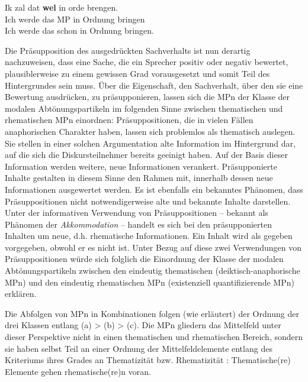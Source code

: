 \begin{exe}
	\ex\label{175} 
	\gll Ik zal dat \textbf{wel} in orde brengen.\\
	 Ich werde das MP in Ordnung bringen \\
	 \glt Ich werde das schon in Ordnung bringen. 
	 \newline
	 \hbox{}\hfill\hbox{\citet[55]{Vriendt1991}}
\end{exe}
Die Präsupposition  des ausgedrückten Sachverhalts ist nun derartig nachzuwei\-sen, dass eine Sache, die ein Sprecher positiv oder negativ bewertet, plausiblerweise zu einem gewissen Grad vorausgesetzt und somit Teil des Hintergrundes sein muss. Über die Eigenschaft, den Sachverhalt, über den sie eine Bewertung ausdrücken, zu präsupponieren, lassen sich die MPn der Klasse der modalen Abtönungspartikeln  im folgenden Sinne zwischen thematischen und rhematischen MPn einordnen: Präsuppositionen, die in vielen Fällen anaphorischen Charakter haben, lassen sich problemlos als thematisch auslegen. Sie stellen in einer solchen Argumentation alte Information im Hintergrund  dar, auf die sich die Diskursteilnehmer bereits geeinigt haben. Auf der Basis dieser Information werden weitere, neue Informationen verankert. Präsupponierte Inhalte gestalten in diesem Sinne den Rahmen mit, innerhalb dessen neue Informationen ausge\-wertet werden. Es ist ebenfalls ein bekanntes Phänomen, dass Präsuppositionen nicht notwendigerweise alte und bekannte Inhalte darstellen. Unter der informativen Verwendung von Präsuppositionen – bekannt als Phänomen der \textit{Akko\-mmodation}  – handelt es sich bei den präsupponierten Inhalten um neue, d.h. rhematische Informationen. Ein Inhalt wird als gegeben vorgegeben, obwohl er es nicht ist. Unter Bezug auf diese zwei Verwendungen von Präsuppositionen würde sich folglich die Einordnung der Klasse der modalen Abtönungspartikeln zwischen den eindeutig thematischen (deiktisch-anaphorische MPn) und den eindeutig rhematischen MPn (existenziell quantifizierende MPn) erklären. 

Die Abfolgen von MPn in Kombinationen folgen (wie erläutert) der Ordnung der drei Klassen entlang (a) > (b) > (c). Die MPn gliedern das Mittelfeld unter dieser Perspektive nicht in einen thematischen und rhematischen Bereich, sondern sie haben selbst Teil an einer Ordnung der Mittelfeldelemente entlang des Kriteriums ihres Grades an Thematizität  bzw. Rhematizität : Thematische(re) E\-lemente gehen rhematische(re)n voran. 

